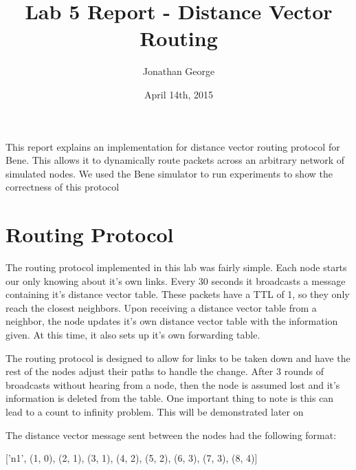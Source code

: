 \documentclass[11pt]{article}
\begin{document}
\lstset{
  language=Python,
  basicstyle=\small,          %
  keywordstyle=\bfseries,
  identifierstyle=,           %
  commentstyle=,              %
  stringstyle=\ttfamily,      %
  showstringspaces=false,     %
  numbers=left,
  numberstyle=\tiny,
  numbersep=5pt,
  frame=tb,
}

\title{Lab 5 Report - Distance Vector Routing}

\author{Jonathan George}

\date{April 14th, 2015}

\maketitle

This report explains an implementation for distance vector routing protocol for Bene. This allows it to dynamically route packets across an arbitrary network of simulated nodes. We used the Bene simulator to run experiments to show the correctness of this protocol




\section{Routing Protocol}

The routing protocol implemented in this lab was fairly simple. Each node starts our only knowing about it's own links. Every 30 seconds it broadcasts a message containing it's distance vector table. These packets have a TTL of 1, so they only reach the closest neighbors. Upon receiving a distance vector table from a neighbor, the node updates it's own distance vector table with the information given. At this time, it also sets up it's own forwarding table. 

The routing protocol is designed to allow for links to be taken down and have the rest of the nodes adjust their paths to handle the change. After 3 rounds of broadcasts without hearing from a node, then the node is assumed lost and it's information is deleted from the table. One important thing to note is this can lead to a count to infinity problem. This will be demonstrated later on

The distance vector message sent between the nodes had the following format:

['n1', (1, 0), (2, 1), (3, 1), (4, 2), (5, 2), (6, 3), (7, 3), (8, 4)]
\end{document}
